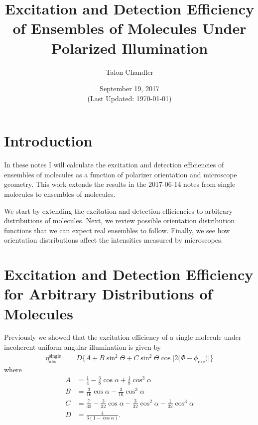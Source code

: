 \documentclass[11pt]{article}
\begin{document}
\title{\vspace{-2.5em} Excitation and Detection Efficiency of Ensembles of
  Molecules Under Polarized Illumination \vspace{-1em}} \author{Talon
  Chandler}%
\date{\vspace{-1em}September 19, 2017\\ (Last Updated: \today)\vspace{-1em}}
\maketitle
\section{Introduction}
In these notes I will calculate the excitation and detection efficiencies of
ensembles of molecules as a function of polarizer orientation and microscope
geometry. This work extends the results in the 2017-06-14 notes from single
molecules to ensembles of molecules.

We start by extending the excitation and detection efficiencies to arbitrary
distributions of molecules. Next, we review possible orientation distribution
functions that we can expect real ensembles to follow. Finally, we see how
orientation distributions affect the intensities measured by microscopes.

\section{Excitation and Detection Efficiency for Arbitrary Distributions of Molecules}
Previously we showed that the excitation efficiency of a single molecule under
incoherent uniform angular illumination is given by
\begin{align}
  \eta_{\text{abs}}^{\text{single}} &= D\{A + B\sin^{2}{\Theta} + C\sin^{2}{\Theta} \cos{[2 (\Phi - \phi_{\text{exc}}})]\}\label{eq:scalarabs}
\end{align}
where
\begin{subequations}
\begin{align}
  A &= \frac{1}{4} - \frac{3}{8} \cos{\alpha } + \frac{1}{8} \cos^{3}{\alpha }\\
  B &= \frac{3}{16} \cos{\alpha } - \frac{3}{16} \cos^{3}{\alpha }\\
  C &= \frac{7}{32} - \frac{3}{32} \cos{\alpha } - \frac{3}{32} \cos^{2}{\alpha } - \frac{1}{32} \cos^{3}{\alpha}\\
  D &= \frac{4}{3(1 - \cos\alpha)}.
\end{align}\label{eq:coefficients}%
\end{subequations}
\end{document}
